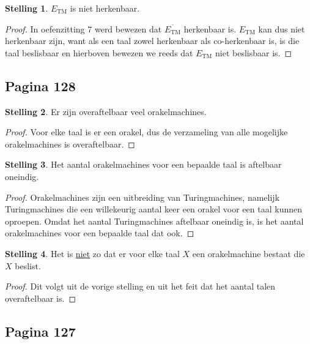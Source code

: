 \documentclass[kulak]{kulakarticle}
\theoremstyle{definition}
\newtheorem*{stelling}{Stelling}
\begin{document}
	\begin{stelling}
		\(E_\text{TM}\) is niet herkenbaar.
	\end{stelling}

	\begin{proof}
		In oefenzitting 7 werd bewezen dat \(\overline{E_\text{TM}}\) herkenbaar is. \(E_\text{TM}\) kan dus niet herkenbaar zijn, want als een taal zowel herkenbaar als co-herkenbaar is, is die taal beslisbaar en hierboven bewezen we reeds dat \(E_\text{TM}\) niet beslisbaar is.
	\end{proof}

	\subsection*{Pagina 128}

	\begin{stelling}
		Er zijn overaftelbaar veel orakelmachines.
	\end{stelling}

	\begin{proof}
		Voor elke taal is er een orakel, dus de verzameling van alle mogelijke orakelmachines is overaftelbaar.
	\end{proof}

	\begin{stelling}
		Het aantal orakelmachines voor een bepaalde taal is aftelbaar oneindig.
	\end{stelling}

	\begin{proof}
		Orakelmachines zijn een uitbreiding van Turingmachines, namelijk Turingmachines die een willekeurig aantal keer een orakel voor een taal kunnen oproepen. Omdat het aantal Turingmachines aftelbaar oneindig is, is het aantal orakelmachines voor een bepaalde taal dat ook.
	\end{proof}

	\begin{stelling}
		Het is \underline{niet} zo dat er voor elke taal \(X\) een orakelmachine bestaat die \(X\) beslist.
	\end{stelling}

	\begin{proof}
		Dit volgt uit de vorige stelling en uit het feit dat het aantal talen overaftelbaar is.
	\end{proof}

	\subsection*{Pagina 127}
\end{document}
